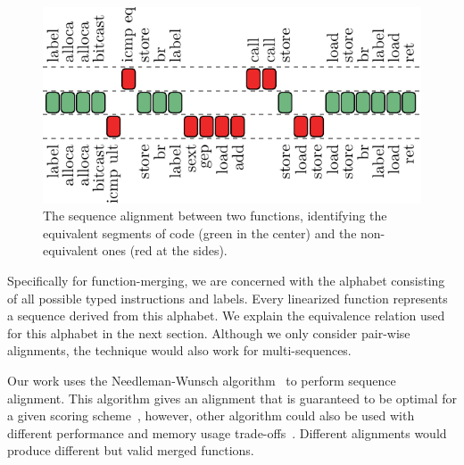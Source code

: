\begin{figure}[t]
  \centering
  \includegraphics[width=0.75\linewidth]{figs/opcode-align.pdf}
  \caption{The sequence alignment between two functions, identifying the equivalent segments of code (green in the center) and the non-equivalent ones (red at the sides).}
  \label{fig:opcode-align}
\end{figure}

Specifically for function-merging, we are concerned with the alphabet
consisting of all possible typed instructions and labels.
Every linearized function represents a sequence derived from this alphabet.
We explain the equivalence relation used for this alphabet in the next section.
Although we only consider pair-wise alignments, the technique would also work
for multi-sequences.


Our work uses the Needleman-Wunsch algorithm~\cite{needleman70} to perform sequence alignment.
This algorithm gives an alignment that is guaranteed to be optimal for a given scoring scheme~\cite{higgins89},
however, other algorithm could also be used with different performance and memory usage trade-offs~\cite{needleman70,smith81,carrillo88,hickey11}.
Different alignments would produce different but valid merged functions.

